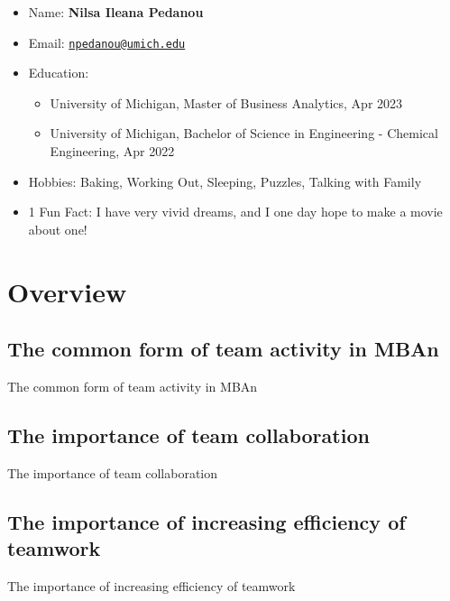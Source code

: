 \documentclass[
]{book}
\begin{document}
\begin{itemize}
\item
  Name: \textbf{Nilsa Ileana Pedanou}
\item
  Email: \href{mailto:npedanou@umich.edu}{\nolinkurl{npedanou@umich.edu}}
\item
  Education:

  \begin{itemize}
  \item
    University of Michigan, Master of Business Analytics, Apr 2023
  \item
    University of Michigan, Bachelor of Science in Engineering - Chemical Engineering, Apr 2022
  \end{itemize}
\item
  Hobbies: Baking, Working Out, Sleeping, Puzzles, Talking with Family
\item
  1 Fun Fact: I have very vivid dreams, and I one day hope to make a movie about one!
\end{itemize}

\hypertarget{overview}{%
\chapter{Overview}\label{overview}}

\hypertarget{the-common-form-of-team-activity-in-mban}{%
\section{The common form of team activity in MBAn}\label{the-common-form-of-team-activity-in-mban}}

The common form of team activity in MBAn

\hypertarget{the-importance-of-team-collaboration}{%
\section{The importance of team collaboration}\label{the-importance-of-team-collaboration}}

The importance of team collaboration

\hypertarget{the-importance-of-increasing-efficiency-of-teamwork}{%
\section{The importance of increasing efficiency of teamwork}\label{the-importance-of-increasing-efficiency-of-teamwork}}

The importance of increasing efficiency of teamwork
\end{document}
